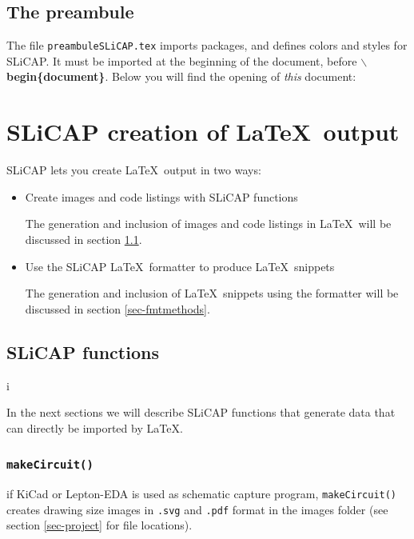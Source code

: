 \documentclass[a4paper,12pt]{article}
\begin{document}
\subsection{The preambule}
The file {\texttt{preambuleSLiCAP.tex}} imports packages, and defines colors and styles for SLiCAP. It must be imported at the beginning of the document, before {\textbf{$\backslash$begin\{document\}}}. Below you will find the opening of {\em{this}} document:



\section{SLiCAP creation of \LaTeX$\,$ output}

SLiCAP lets you create \LaTeX$\,$ output in two ways:

\begin{itemize}
\item Create images and code listings with SLiCAP functions

The generation and inclusion of images and code listings in \LaTeX$\,$ will be discussed in section \ref{sec-slicapfncts}.

\item Use the SLiCAP \LaTeX$\,$ formatter to produce \LaTeX$\,$ snippets

The generation and inclusion of \LaTeX$\,$ snippets using the formatter will be discussed in section \ref{sec-fmtmethods}.
\end{itemize}

\subsection{SLiCAP functions}\label{sec-slicapfncts}  i

In the next sections we will describe SLiCAP functions that generate data that can directly be imported by \LaTeX.

\subsubsection{\texttt{makeCircuit()}}

if KiCad or Lepton-EDA is used as schematic capture program, {\texttt{makeCircuit()}} creates drawing size images in {\texttt{.svg}} and {\texttt{.pdf}} format in the images folder (see section \ref{sec-project} for file locations).
\end{document}
